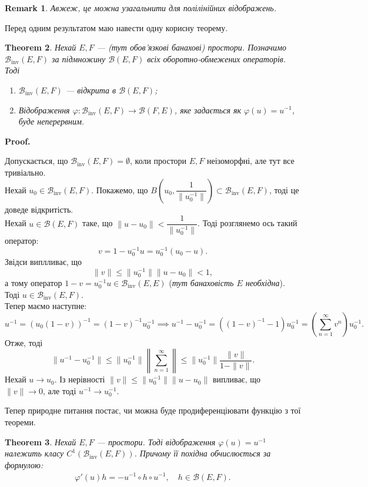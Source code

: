 \documentclass[a4paper, 10pt]{article}
\makeatletter
\theoremstyle{theoremdd}
\newtheorem{theorem}{Theorem}[subsection]
\theoremstyle{theoremdd}
\theoremstyle{theoremdd}
\theoremstyle{theoremdd}
\theoremstyle{theoremdd}
\theoremstyle{theoremdd}
\newtheorem{remark}[theorem]{Remark}
\theoremstyle{theoremdd}
\theoremstyle{theoremdd}
\renewenvironment{proof}[1][Proof.\\]{\par
\pushQED{\hfill \qed}%
\normalfont \topsep6\p@\@plus6\p@\relax
\trivlist
\item\relax
{\bfseries
#1\@addpunct{.}}\hspace\labelsep\ignorespaces
}{%
\popQED\endtrivlist\@endpefalse
}
\DeclareMathOperator{\inv}{inv}
\makeatother
\begin{document}
\begin{remark}
Авжеж, це можна узагальнити для полілінійних відображень.
\end{remark}

Перед одним результатом маю навести одну корисну теорему.
\begin{theorem}
Нехай $E,F$ --- (\textit{тут обов'язкові банахові}) простори. Позначимо $\mathcal{B}_{\inv}(E,F)$ за підмножину $\mathcal{B}(E,F)$ всіх оборотно-обмежених операторів. Тоді
\begin{enumerate}[nosep,wide=0pt,label={\arabic*)}]
\item $\mathcal{B}_{\inv}(E,F)$ --- відкрита в $\mathcal{B}(E,F)$;
\item Відображення $\varphi \colon \mathcal{B}_{\inv}(E,F) \to \mathcal{B}(F,E)$, яке задається як $\varphi(u) = u^{-1}$, буде неперервним.
\end{enumerate}
\end{theorem}

\begin{proof}
Допускається, що $\mathcal{B}_{\inv}(E,F) = \emptyset$, коли простори $E,F$ неізоморфні, але тут все тривіально.\\
Нехай $u_0 \in \mathcal{B}_{\inv}(E,F)$. Покажемо, що $B\left(u_0, \dfrac{1}{\|u_0^{-1}\|}\right) \subset \mathcal{B}_{\inv}(E,F)$, тоді це доведе відкритість.\\
Нехай $u \in \mathcal{B}(E,F)$ таке, що $\|u-u_0\| < \dfrac{1}{\|u_0^{-1}\|}$. Тоді розглянемо ось такий оператор:
\[
v = 1 - u_0^{-1} u = u_0^{-1}(u_0 - u).
\]
Звідси виплливає, що
\[
\|v\| \leq \|u_0^{-1}\| \|u-u_0\| < 1,
\]
а тому оператор $1-v = u_0^{-1}u \in \mathcal{B}_{\inv}(E,E)$ (\textit{тут банаховість $E$ необхідна}). Тоді $u \in \mathcal{B}_{\inv}(E,F)$.
\bigskip \\
Тепер маємо наступне:
\[
u^{-1} = (u_0(1-v))^{-1}
 = (1-v)^{-1} u_0^{-1} \implies u^{-1} - u_0^{-1} = ((1-v)^{-1}-1) u_0^{-1} = \left(\sum_{n=1}^\infty v^n \right)u_0^{-1}.
 \]
Отже, тоді
\[
\|u^{-1} - u_0^{-1}\| \leq \|u_0^{-1}\| \left\| \sum_{n=1}^\infty \right\| \leq \|u_0^{-1}\| \dfrac{\|v\|}{1-\|v\|}.
\]
Нехай $u \to u_0$. Із нерівності $\|v\| \leq \|u_0^{-1}\| \|u-u_0\|$ випливає, що $\|v\| \to 0$, але тоді $u^{-1} \to u_0^{-1}$.
\end{proof}

Тепер природне питання постає, чи можна буде продиференціювати функцію з тої теореми.

\begin{theorem}
Нехай $E,F$ --- простори. Тоді відображення $\varphi(u) = u^{-1}$ належить класу $C^1(\mathcal{B}_{\inv}(E,F))$. Причому її похідна обчислюється за формулою:
\begin{align*}
\varphi'(u) h = -u^{-1} \circ h \circ u^{-1},\quad h \in \mathcal{B}(E,F).
\end{align*}
\end{theorem}
\end{document}
